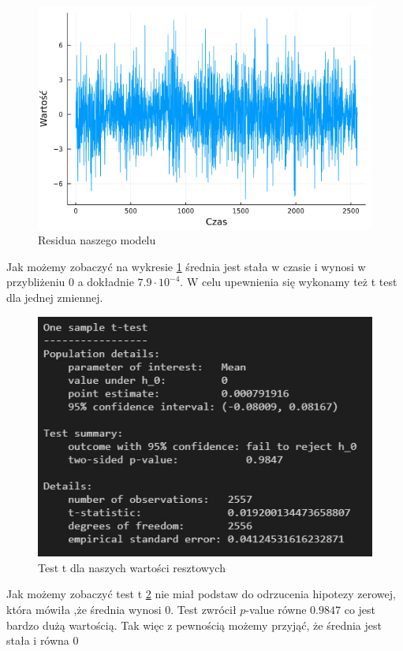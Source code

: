 \documentclass[12pt]{article}
\begin{document}
	\begin{figure}[H]
	\centering
	\includegraphics[width=3\columnwidth/4]{img/residua.png}
	\caption{Residua naszego modelu}
	\label{fig:residua}
\end{figure}
 Jak możemy zobaczyć na wykresie \ref{fig:residua} średnia jest stała w czasie i wynosi w przybliżeniu $0$  a dokładnie $ 7.9 \cdot 10^{-4}$. 
 W celu upewnienia się wykonamy też t test dla jednej zmiennej.
 	\begin{figure}[H]
 	\centering
 	\includegraphics[width=3\columnwidth/4]{img/t_test.png}
 	\caption{Test t dla naszych wartości resztowych}
 	\label{t_test}
 \end{figure}
Jak możemy zobaczyć test t \ref{t_test} nie miał podstaw do odrzucenia hipotezy zerowej, która mówiła ,że średnia wynosi $0$. Test zwrócił $p$-value równe $0.9847$ co jest bardzo dużą wartością.
Tak więc z pewnością możemy przyjąć, że średnia jest stała i równa $0$
\end{document}

